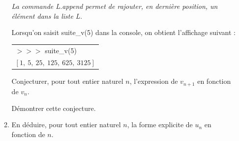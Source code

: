 \documentclass[10pt]{article}
\begin{document}
\begin{enumerate}
\begin{enumerate}
\emph{La commande \og L.append \fg permet de rajouter, en dernière position, un élément dans la liste L.}

Lorsqu'on saisit {\ttfamily suite\_v(5)} dans la console, on obtient l'affichage suivant :

\begin{center}
\begin{tabular}{>{\ttfamily} l}
$>>>$ suite\_v(5)\\
$[1,\: 5,\: 25,\: 125,\: 625,\: 3125]$\\
\end{tabular}
\end{center}

Conjecturer, pour tout entier naturel $n$, l'expression de $v_{n+1}$ en fonction de $v_n$.

Démontrer cette conjecture.
		\item En déduire, pour tout entier naturel $n$, la forme explicite de $u_n$ en fonction de $n$.
	\end{enumerate}
\end{enumerate}

\bigskip
\end{document}

